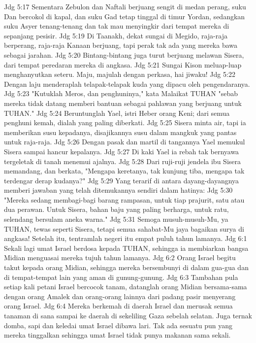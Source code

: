Jdg 5:17  Sementara Zebulon dan Naftali berjuang sengit di medan perang, suku Dan bercokol di kapal, dan suku Gad tetap tinggal di timur Yordan, sedangkan suku Asyer tenang-tenang dan tak mau menyingkir dari tempat mereka di sepanjang pesisir.
Jdg 5:19  Di Taanakh, dekat sungai di Megido, raja-raja berperang, raja-raja Kanaan berjuang, tapi perak tak ada yang mereka bawa sebagai jarahan.
Jdg 5:20  Bintang-bintang juga turut berjuang melawan Sisera, dari tempat peredaran mereka di angkasa.
Jdg 5:21  Sungai Kison meluap-luap menghanyutkan seteru. Maju, majulah dengan perkasa, hai jiwaku!
Jdg 5:22  Dengan laju menderaplah telapak-telapak kuda yang dipacu oleh pengendaranya.
Jdg 5:23  "Kutuklah Meros, dan penghuninya," kata Malaikat TUHAN "sebab mereka tidak datang memberi bantuan sebagai pahlawan yang berjuang untuk TUHAN."
Jdg 5:24  Beruntunglah Yael, istri Heber orang Keni; dari semua penghuni kemah, dialah yang paling diberkati.
Jdg 5:25  Sisera minta air, tapi ia memberikan susu kepadanya, disajikannya susu dalam mangkuk yang pantas untuk raja-raja.
Jdg 5:26  Dengan pasak dan martil di tangannya Yael memukul Sisera sampai hancur kepalanya.
Jdg 5:27  Di kaki Yael ia rebah tak bernyawa tergeletak di tanah menemui ajalnya.
Jdg 5:28  Dari ruji-ruji jendela ibu Sisera memandang, dan berkata, "Mengapa keretanya, tak kunjung tiba, mengapa tak terdengar derap kudanya?"
Jdg 5:29  Yang terarif di antara dayang-dayangnya memberi jawaban yang telah ditemukannya sendiri dalam hatinya:
Jdg 5:30  "Mereka sedang membagi-bagi barang rampasan, untuk tiap prajurit, satu atau dua perawan. Untuk Sisera, bahan baju yang paling berharga, untuk ratu, selendang bersulam aneka warna."
Jdg 5:31  Semoga musuh-musuh-Mu, ya TUHAN, tewas seperti Sisera, tetapi semua sahabat-Mu jaya bagaikan surya di angkasa! Setelah itu, tentramlah negeri itu empat puluh tahun lamanya.
Jdg 6:1  Sekali lagi umat Israel berdosa kepada TUHAN, sehingga ia membiarkan bangsa Midian menguasai mereka tujuh tahun lamanya.
Jdg 6:2  Orang Israel begitu takut kepada orang Midian, sehingga mereka bersembunyi di dalam gua-gua dan di tempat-tempat lain yang aman di gunung-gunung.
Jdg 6:3  Tambahan pula setiap kali petani Israel bercocok tanam, datanglah orang Midian bersama-sama dengan orang Amalek dan orang-orang lainnya dari padang pasir menyerang orang Israel.
Jdg 6:4  Mereka berkemah di daerah Israel dan merusak semua tanaman di sana sampai ke daerah di sekeliling Gaza sebelah selatan. Juga ternak domba, sapi dan keledai umat Israel dibawa lari. Tak ada sesuatu pun yang mereka tinggalkan sehingga umat Israel tidak punya makanan sama sekali.
